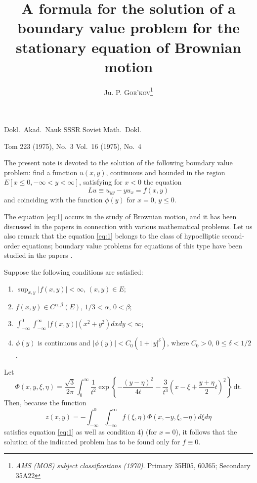 \documentclass[a4paper,12pt]{article}
\title{A formula for the solution of a boundary value problem for the stationary equation of Brownian motion}
\author{Ju. P. \textsc{Gor'kov}\footnote{\emph{AMS (MOS) subject classifications (1970)}. Primary 35H05, 60J65; Secondary 35A22}}
\date{}
\newcommand{\dd}{\,\mathrm{d}}
\begin{document}
\noindent
Dokl.\ Akad.\ Nauk SSSR    
\hspace{9cm}
Soviet Math.\ Dokl.\

\noindent
Tom 223 (1975), No.\ 3 
\hspace{9cm}
Vol.\ 16 (1975), No.\ 4

{\let\newpage\relax\maketitle}

\maketitle


The present note is devoted to the solution of the following boundary value problem: find a function $u(x, y)$, continuous and bounded in the region $E[x \leq 0,-\infty<y<\infty]$, satisfying for $x<0$ the equation
\begin{equation} \label{eq:1}
L u \equiv u_{y y}-y u_{x}=f(x, y)
\end{equation}
and coinciding with the function $\phi(y)$ for $x=0$, $y \leq 0$.

The equation \eqref{eq:1} occurs in the study of Brownian motion, and it has been discussed in the papers \cite{zbMATH02540748,uhlenbeck1930theory,chandrasekhar1943stochastic} in connection with various mathematical problems. Let us also remark that the equation \eqref{eq:1} belongs to the class of hypoelliptic second-order equations; boundary value problems for equations of this type have been studied in the papers \cite{zbMATH03345727,zbMATH03280571}.

Suppose the following conditions are satisfied:
\begin{enumerate}
	\item $\sup _{x, y}|f(x, y)|<\infty$, $(x, y) \in E$;
	\item $f(x, y) \in C^{\alpha,\beta}(E)$, $1 / 3<\alpha$, $0<\beta$;
	\item $\int_{-\infty}^{0} \int_{-\infty}^{\infty}|f(x, y)|\left(x^{2}+y^{2}\right) d x d y<\infty$;
	\item $\phi(y)$ is continuous and $|\phi(y)|<C_{0}\left(1+|y|^{\delta}\right)$, where $C_{0}>0$, $0 \leq \delta <1 / 2$.
\end{enumerate}
Let
$$
\Phi(x, y, \xi, \eta)=\frac{\sqrt{3}}{2 \pi} \int_{0}^{\infty} \frac{1}{t^{2}} \exp \left\{-\frac{(y-\eta)^{2}}{4 t}-\frac{3}{t^{3}}\left(x-\xi+\frac{y+\eta}{2} t\right)^{2}\right\} \dd t .
$$
Then, because the function
$$
z(x, y)=-\int_{-\infty}^{0} \int_{-\infty}^{\infty} f(\xi, \eta) \Phi(x,-y, \xi,-\eta) d \xi d \eta
$$
satisfies equation \eqref{eq:1} as well as condition 4) (for $x=0$), it follows that the solution of the indicated problem has to be found only for $f \equiv 0$.
\end{document}
